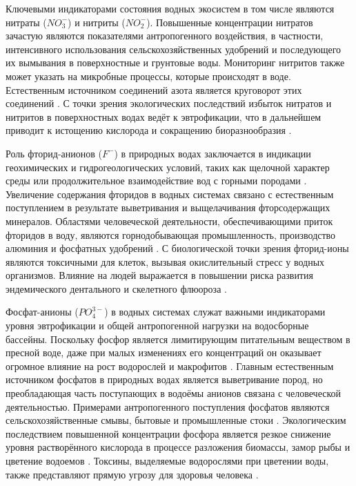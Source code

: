 Ключевыми индикаторами состояния водных экосистем в том числе являются нитраты ($NO_3^-$) и нитриты ($NO_2^-$). Повышенные концентрации нитратов зачастую являются показателями антропогенного воздействия, в частности, интенсивного использования сельскохозяйственных удобрений и последующего их вымывания в поверхностные и грунтовые воды. Мониторинг нитритов также может указать на микробные процессы, которые происходят в воде. Естественным источником соединений азота является круговорот этих соединений \cite{oliverImpactsClimateChange2024, arndtOnlineHighresolutionRealtime2026}. С точки зрения экологических последствий избыток нитратов и нитритов в поверхностных водах ведёт к эвтрофикации, что в дальнейшем приводит к истощению кислорода и сокращению биоразнообразия \cite{arndtOnlineHighresolutionRealtime2026}.

Роль фторид-анионов ($F^-$) в природных водах заключается в индикации геохимических и гидрогеологических условий, таких как щелочной характер среды или продолжительное взаимодействие вод с горными породами \cite{zhaoFluorineShallowGroundwater2023, shajiFluorideContaminationGroundwater2024}. Увеличение содержания фторидов в водных системах связано с естественным поступлением в результате выветривания и выщелачивания фторсодержащих минералов. Областями человеческой деятельности, обеспечивающими приток фторидов в воду, являются горнодобывающая промышленность, производство алюминия и фосфатных удобрений \cite{shajiFluorideContaminationGroundwater2024}. С биологической точки зрения фторид-ионы являются токсичными для клеток, вызывая окислительный стресс у водных организмов. Влияние на людей выражается в повышении риска развития эндемического дентального и скелетного флюороза \cite{shajiFluorideContaminationGroundwater2024, zhaoFluorineShallowGroundwater2023}.

Фосфат-анионы ($PO_4^{3-}$) в водных системах служат важными индикаторами уровня эвтрофикации и общей антропогенной нагрузки на водосборные бассейны. Поскольку фосфор является лимитирующим питательным веществом в пресной воде, даже при малых изменениях его концентраций он оказывает огромное влияние на рост водорослей и макрофитов \cite{sureshRecentAdvancementWater2023, qinEutrophicationControlLarge2023}. Главным естественным источником фосфатов в природных водах является выветривание пород, но преобладающая часть поступающих в водоёмы анионов связана с человеческой деятельностью. Примерами антропогенного поступления фосфатов являются сельскохозяйственные смывы, бытовые и промышленные стоки \cite{qinEutrophicationControlLarge2023}. Экологическим последствием повышенной концентрации фосфора является резкое снижение уровня растворённого кислорода в процессе разложения биомассы, замор рыбы и цветение водоемов \cite{marinRelativeEffectsEutrophication2025}. Токсины, выделяемые водорослями при цветении воды, также представляют прямую угрозу для здоровья человека \cite{sureshRecentAdvancementWater2023}.

